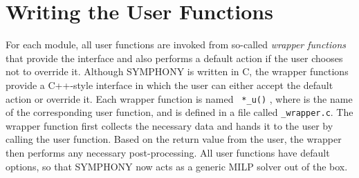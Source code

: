 \section{Writing the User Functions}

For each module, all user functions are invoked from so-called \emph{wrapper
functions} that provide the interface and also performs a default action if
the user chooses not to override it. Although SYMPHONY is written in C, the
wrapper functions provide a C++-style interface in which the user can either
accept the default action or override it. Each wrapper function is named {\tt
*\_u()} , where {\tt *} is the name of the corresponding user function, and is
defined in a file called {\tt *\_wrapper.c}. The wrapper function first
collects the necessary data and hands it to the user by calling the user
function. Based on the return value from the user, the wrapper then performs
any necessary post-processing. All user functions have default options, so
that SYMPHONY now acts as a generic MILP solver out of the box.


